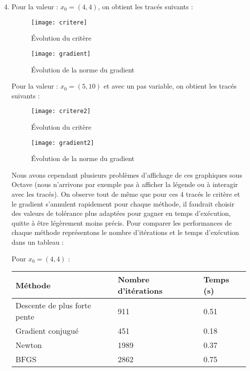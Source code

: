\documentclass[12pt,a4paper,titlepage]{article}
\begin{document}
\begin{enumerate}
        \setcounter{enumi}{3}
    \item{
            Pour la valeur : $x_0 = (4, 4)$, on obtient les tracés suivants :

            \begin{figure}[H]
                \centering
                \texttt{[image: critere]}
                \caption{Évolution du critère}
            \end{figure}

            \begin{figure}[H]
                \centering
                \texttt{[image: gradient]}
                \caption{Évolution de la norme du gradient}
            \end{figure}

            Pour la valeur : $x_0 = (5, 10)$ et avec un pas variable, on obtient les tracés suivants :

            \begin{figure}[H]
                \centering
                \texttt{[image: critere2]}
                \caption{Évolution du critère}
            \end{figure}

            \begin{figure}[H]
                \centering
                \texttt{[image: gradient2]}
                \caption{Évolution de la norme du gradient}
            \end{figure}

            Nous avons cependant plusieurs problèmes d'affichage de ces graphiques sous Octave
            (nous n'arrivons par exemple pas à afficher la légende ou à interagir avec les tracés).
            On observe tout de même que pour ces 4 tracés le critère et le gradient s'annulent
            rapidement pour chaque méthode, il faudrait choisir des valeurs de tolérance plus
            adaptées pour gagner en temps d'exécution, quitte à être légèrement moins précis.
            Pour comparer les performances de chaque méthode représentons le nombre d'itérations
            et le temps d'exécution dans un tableau :

            Pour $x_0 = (4,4)$ :

            \begin{table}[H]
                \begin{tabularx}{\textwidth}{ |l|X|X| }
                    \hline
                    Méthode & Nombre d'itérations & Temps (s) \\
                    \hline
                    Descente de plus forte pente & 911 & 0.51 \\
                    \hline
                    Gradient conjugué & 451  & 0.18 \\
                    \hline
                    Newton & 1989 & 0.37 \\
                    \hline
                    BFGS & 2862 & 0.75 \\
                    \hline
                \end{tabularx}
            \end{table}

}
\end{enumerate}
\end{document}
